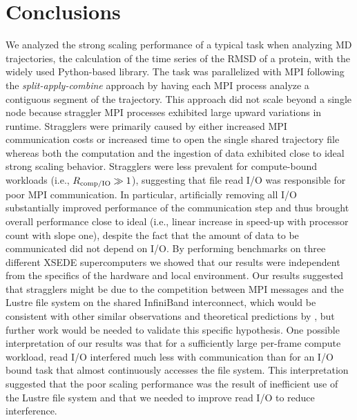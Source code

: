 
\section{Conclusions}
\label{sec:conclusions}

We analyzed the strong scaling performance of a typical task when analyzing MD trajectories, the calculation of the time series of the RMSD of a protein, with the widely used Python-based  library.
The task was parallelized with MPI following the \emph{split-apply-combine} approach by having each MPI process analyze a contiguous segment of the trajectory.
This approach did not scale beyond a single node because straggler MPI processes exhibited large upward variations in runtime.
Stragglers were primarily caused by either increased MPI communication costs or increased time to open the single shared trajectory file whereas both the computation and the ingestion of data exhibited close to ideal strong scaling behavior.
Stragglers were less prevalent for compute-bound workloads (i.e., $R_{\text{comp/IO}} \gg 1$), suggesting that file read I/O was responsible for poor MPI communication.
In particular, artificially removing all I/O substantially improved performance of the communication step and thus brought overall performance close to ideal (i.e., linear increase in speed-up with processor count with slope one), despite the fact that the amount of data to be communicated did not depend on I/O.
By performing benchmarks on three different XSEDE supercomputers we showed that our results were independent from the specifics of the hardware and local environment.
Our results suggested that stragglers might be due to the competition between MPI messages and the Lustre file system on the shared InfiniBand interconnect, which would be consistent with other similar observations \cite{VMD2013} and theoretical predictions by \citet{Brown:2018ab}, but further work would be needed to validate this specific hypothesis.
One possible interpretation of our results was that for a sufficiently large per-frame compute workload, read I/O interfered much less with communication than for an I/O bound task that almost continuously accesses the file system.
This interpretation suggested that the poor scaling performance was the result of inefficient use of the Lustre file system and that we needed to improve read I/O to reduce interference.

